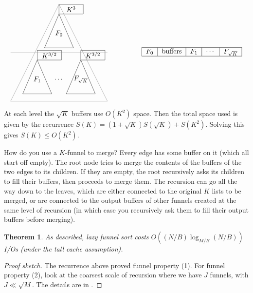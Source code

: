 \documentclass[11pt]{article}
\newtheorem{theorem}{Theorem}
\begin{document}
\[
\begin{tikzpicture}[scale = 2.5, baseline=70pt]
  \draw[gray] (1,2) -- (0,0) -- (2,0) -- (1,2);
  \draw (1,1.8) -- (0.7,1.1) -- (1.3,1.1) -- (1,1.8);
  \draw (0.55,0.85) -- (0.25,0.15) -- (0.85,0.15) -- (0.55,0.85);
  \draw (1.45,0.85) -- (1.15,0.15) -- (1.75,0.15) -- (1.45,0.85);

  \draw (1,1.4) node {$F_0$};
  \draw (.55,.45) node {$F_1$};
  \draw (1.45,.45) node {$F_{\sqrt{K}}$};
  \draw (1,.45) node {$\cdots$};

  \draw (1.0,1.8) rectangle (1.5, 2.0);
  \draw (0.55,0.85) rectangle (1.05, 1.05);
  \draw (1.45,0.85) rectangle (1.95, 1.05);

  \draw (1.25,1.9) node {$K^3$};
  \draw (0.8,.95) node {$K^{3/2}$};
  \draw (1.7,.95) node {$K^{3/2}$};

  \draw[gray] (0,1) -- (2,1);
\end{tikzpicture}
\hspace{50pt}
\begin{tabular}{|c|c|c|c|c|}
  \hline $F_0$ & buffers & $F_1$ & $\cdots$ & $F_{\sqrt{K}}$ \\ \hline
\end{tabular}
\]

At each level the $\sqrt{K}$ buffers use $O(K^2)$ space. Then the
total space used is given by the recurrence $S(K) =
(1+\sqrt{K})S(\sqrt{K}) + S(K^2)$. Solving this gives $S(K) \le
O(K^2)$.

How do you use a $K$-funnel to merge? Every edge has some buffer on
it (which all start off empty). The root node tries to merge the contents of the buffers of the two edges to its children. If they are empty, the root recursively asks its children to fill their buffers, then proceeds to merge them. The recursion can go all the way down to the leaves, which are either connected to the original $K$ lists to be merged, or are connected to the output buffers of other funnels created at the same level of recursion (in which case you recursively ask them to fill their output buffers before merging). 

\begin{theorem}
  As described, lazy funnel sort costs $O((N/B) \log_{M/B}(N/B))$ I/Os
  (under the tall cache assumption).
\end{theorem}

\begin{proof}[Proof sketch]
  The recurrence above proved funnel property (1). For funnel property
  (2), look at the coarsest scale of recursion where we have $J$
  funnels, with $J \ll \sqrt{M}$. The details are in
  \cite{demaine2002cache}.
\end{proof}
\end{document}

